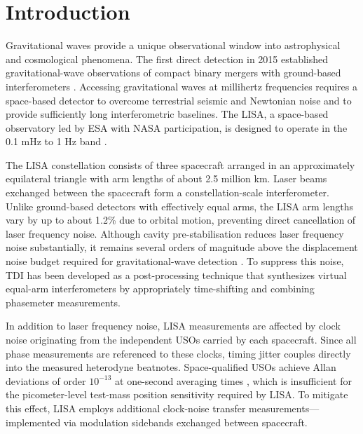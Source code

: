 \section{Introduction}
Gravitational waves provide a unique observational window into astrophysical and cosmological phenomena. The first direct detection in 2015 established gravitational-wave observations of compact binary mergers with ground-based interferometers \cite{abbott2016observation}. Accessing gravitational waves at millihertz frequencies requires a space-based detector to overcome terrestrial seismic and Newtonian noise and to provide sufficiently long interferometric baselines. The \ac{LISA}, a space-based observatory led by ESA with NASA participation, is designed to operate in the 0.1 mHz to 1 Hz band \cite{colpi_lisa_2024}.

The \ac{LISA} constellation consists of three spacecraft arranged in an approximately equilateral triangle with arm lengths of about 2.5 million km. Laser beams exchanged between the spacecraft form a constellation-scale interferometer. Unlike ground-based detectors with effectively equal arms, the LISA arm lengths vary by up to about 1.2\% due to orbital motion, preventing direct cancellation of laser frequency noise. Although cavity pre-stabilisation reduces laser frequency noise substantially, it remains several orders of magnitude above the displacement noise budget required for gravitational-wave detection \cite{bayle_unified_2023}. To suppress this noise, \ac{TDI} has been developed as a post-processing technique that synthesizes virtual equal-arm interferometers by appropriately time-shifting and combining phasemeter measurements.

In addition to laser frequency noise, LISA measurements are affected by clock noise originating from the independent \acp{USO} carried by each spacecraft. Since all phase measurements are referenced to these clocks, timing jitter couples directly into the measured heterodyne beatnotes. Space-qualified \acp{USO} achieve Allan deviations of order $10^{-13}$ at one-second averaging times \cite{weaver2010performance}, which is insufficient for the picometer-level test-mass position sensitivity required by LISA. To mitigate this effect, LISA employs additional clock-noise transfer measurements—implemented via modulation sidebands exchanged between spacecraft.
 

